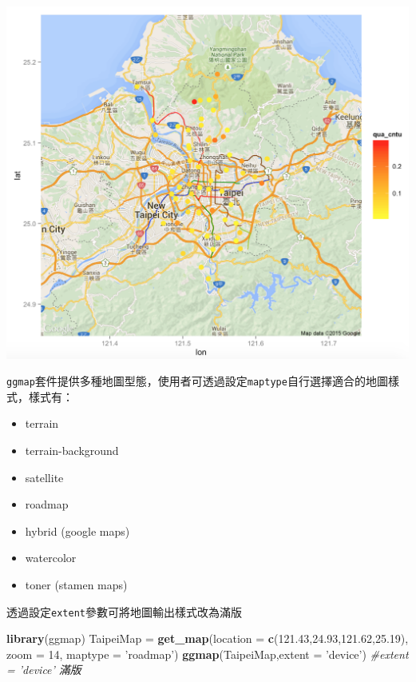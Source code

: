 \documentclass[]{book}
\newenvironment{Shaded}{\begin{snugshade}}{\end{snugshade}}
\newcommand{\KeywordTok}[1]{\textcolor[rgb]{0.13,0.29,0.53}{\textbf{{#1}}}}
\newcommand{\DataTypeTok}[1]{\textcolor[rgb]{0.13,0.29,0.53}{{#1}}}
\newcommand{\DecValTok}[1]{\textcolor[rgb]{0.00,0.00,0.81}{{#1}}}
\newcommand{\FloatTok}[1]{\textcolor[rgb]{0.00,0.00,0.81}{{#1}}}
\newcommand{\StringTok}[1]{\textcolor[rgb]{0.31,0.60,0.02}{{#1}}}
\newcommand{\CommentTok}[1]{\textcolor[rgb]{0.56,0.35,0.01}{\textit{{#1}}}}
\newcommand{\NormalTok}[1]{{#1}}
\providecommand{\tightlist}{%
  \setlength{\itemsep}{0pt}\setlength{\parskip}{0pt}}
\theoremstyle{definition}
\theoremstyle{definition}
\theoremstyle{remark}
\begin{document}
\includegraphics[width=16.39in]{figure/waterQ}

\texttt{ggmap}套件提供多種地圖型態，使用者可透過設定\texttt{maptype}自行選擇適合的地圖樣式，樣式有：

\begin{itemize}
\tightlist
\item
  terrain
\item
  terrain-background
\item
  satellite
\item
  roadmap
\item
  hybrid (google maps)
\item
  watercolor
\item
  toner (stamen maps)
\end{itemize}

透過設定\texttt{extent}參數可將地圖輸出樣式改為滿版

\begin{Shaded}
\begin{Highlighting}[]
\KeywordTok{library}\NormalTok{(ggmap)}
\NormalTok{TaipeiMap =}\StringTok{ }\KeywordTok{get_map}\NormalTok{(}\DataTypeTok{location =} \KeywordTok{c}\NormalTok{(}\FloatTok{121.43}\NormalTok{,}\FloatTok{24.93}\NormalTok{,}\FloatTok{121.62}\NormalTok{,}\FloatTok{25.19}\NormalTok{), }
                    \DataTypeTok{zoom =} \DecValTok{14}\NormalTok{, }\DataTypeTok{maptype =} \StringTok{'roadmap'}\NormalTok{)}
\KeywordTok{ggmap}\NormalTok{(TaipeiMap,}\DataTypeTok{extent =} \StringTok{'device'}\NormalTok{) }\CommentTok{#extent = 'device' 滿版}
\end{Highlighting}
\end{Shaded}
\end{document}
